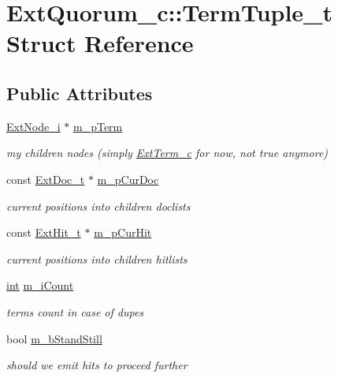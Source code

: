 \hypertarget{structExtQuorum__c_1_1TermTuple__t}{\section{Ext\-Quorum\-\_\-c\-:\-:Term\-Tuple\-\_\-t Struct Reference}
\label{structExtQuorum__c_1_1TermTuple__t}
}
\subsection*{Public Attributes}
\begin{DoxyCompactItemize}
\item 
\hyperlink{classExtNode__i}{Ext\-Node\-\_\-i} $\ast$ \hyperlink{structExtQuorum__c_1_1TermTuple__t_a3a43f9e9499d379ee9ef3c30a64a1b4d}{m\-\_\-p\-Term}
\begin{DoxyCompactList}\small\item\em my children nodes (simply \hyperlink{classExtTerm__c}{Ext\-Term\-\_\-c} for now, not true anymore) \end{DoxyCompactList}\item 
const \hyperlink{structExtDoc__t}{Ext\-Doc\-\_\-t} $\ast$ \hyperlink{structExtQuorum__c_1_1TermTuple__t_abaee7cb9e84136853b2800aafe1bcf16}{m\-\_\-p\-Cur\-Doc}
\begin{DoxyCompactList}\small\item\em current positions into children doclists \end{DoxyCompactList}\item 
const \hyperlink{structExtHit__t}{Ext\-Hit\-\_\-t} $\ast$ \hyperlink{structExtQuorum__c_1_1TermTuple__t_a2f9e78351ddec1091533fbe5e434da74}{m\-\_\-p\-Cur\-Hit}
\begin{DoxyCompactList}\small\item\em current positions into children hitlists \end{DoxyCompactList}\item 
\hyperlink{sphinxexpr_8cpp_a4a26e8f9cb8b736e0c4cbf4d16de985e}{int} \hyperlink{structExtQuorum__c_1_1TermTuple__t_a001ab978f610448e994acc30beeb2587}{m\-\_\-i\-Count}
\begin{DoxyCompactList}\small\item\em terms count in case of dupes \end{DoxyCompactList}\item 
bool \hyperlink{structExtQuorum__c_1_1TermTuple__t_a446e5834964ab6352810922723c4f5ba}{m\-\_\-b\-Stand\-Still}
\begin{DoxyCompactList}\small\item\em should we emit hits to proceed further \end{DoxyCompactList}\end{DoxyCompactItemize}


